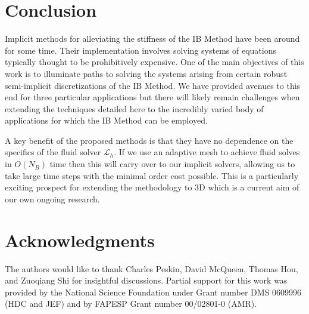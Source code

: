 \documentclass[preprint,12pt]{elsarticle}
\begin{document}
\section{Conclusion}
\label{Sec:Conclusions}
Implicit methods for alleviating the stiffness of the IB Method have been around for some time. Their implementation involves solving systems of equations typically thought to be prohibitively expensive. One of the main objectives of this work is to illuminate paths to solving the systems arising from certain robust semi-implicit discretizations of the IB Method. We have provided avenues to this end for three particular applications but there will likely remain challenges when extending the techniques detailed here to the incredibly varied body of applications for which the IB Method can be employed.

A key benefit of the proposed methods is that they have no dependence on the specifics of the fluid solver $\mathcal{L}_h$. If we use an adaptive mesh to achieve fluid solves in $O(N_B)$ time then this will carry over to our implicit solvers, allowing us to take large time steps with the minimal order cost possible. This is a particularly exciting prospect for extending the methodology to 3D which is a current aim of our own ongoing research. 

\section*{Acknowledgments}
The authors would like to thank Charles Peskin, David McQueen, Thomas Hou, and Zuoqiang Shi for insightful discussions. 
Partial support for this work was provided by the National Science Foundation under Grant number  DMS 0609996 (HDC and JEF) and by FAPESP Grant number 00/02801-0 (AMR).








\end{document}

